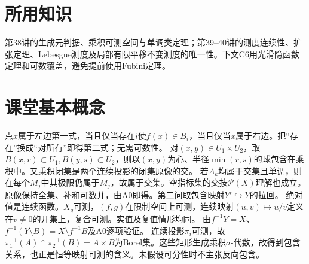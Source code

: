 \documentclass[UTF8,fontset=fandol,11pt]{ctexart}
\begin{document}
\section*{所用知识}
第38讲的生成元判据、乘积可测空间与单调类定理；第39--40讲的测度连续性、扩张定理、Lebesgue测度及局部有限平移不变测度的唯一性。下文C6用光滑隐函数定理和可数覆盖，避免提前使用Fubini定理。
\section{课堂基本概念}
点$x$属于左边第一式，当且仅当存在$i$使$f(x)\in B_i$，当且仅当$x$属于右边。把“存在”换成“对所有”即得第二式；无需可数性。
对$(x,y)\in U_1\times U_2$，取$B(x,r)\subset U_1,B(y,s)\subset U_2$，则以$(x,y)$为心、半径$\min(r,s)$的球包含在乘积中。又乘积闭集是两个连续投影的闭集原像的交。
若$A_k$均属于交集且单调，则在每个$M_j$中其极限仍属于$M_j$，故属于交集。空指标集的交按$\mathcal P(X)$理解也成立。
原像保持全集、补和可数并，由A0即得。第二问取包含映射$Y'\hookrightarrow Y$的拉回。
绝对值是连续函数。$X_g$可测，$(f,g)$在限制空间上可测，连续映射$(u,v)\mapsto u/v$定义在$v\ne0$的开集上，复合可测。实值及复值情形均同。
由$f^{-1}Y=X$、$f^{-1}(Y\setminus B)=X\setminus f^{-1}B$及A0逐项验证。
连续投影$\pi_i$可测，故$\pi_1^{-1}(A)\cap\pi_2^{-1}(B)=A\times B$为Borel集。这些矩形生成乘积$\sigma$-代数，故得到包含关系，也正是恒等映射可测的含义。未假设可分性时不主张反向包含。
\end{document}
